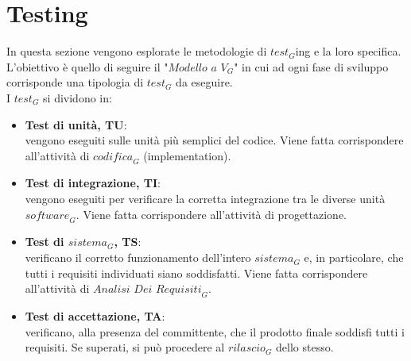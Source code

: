 \section{Testing}
In questa sezione vengono esplorate le metodologie di $\textit{test}_G$ing e la loro specifica. L'obiettivo è quello di seguire il "$\textit{Modello a V}_G$" in cui ad ogni fase di sviluppo corrisponde una tipologia di $\textit{test}_G$ da eseguire.\\
I $\textit{test}_G$ si dividono in:
\begin{itemize}
    \item \textbf{Test di unità, TU}:\\
    vengono eseguiti sulle unità più semplici del codice. Viene fatta corrispondere all'attività di $\textit{codifica}_G$ (implementation).
    \item \textbf{Test di integrazione, TI}:\\
    vengono eseguiti per verificare la corretta integrazione tra le diverse unità $\textit{software}_G$. Viene fatta corrispondere all'attività di progettazione.
    \item \textbf{Test di $\textit{sistema}_G$, TS}:\\
    verificano il corretto funzionamento dell'intero $\textit{sistema}_G$ e, in particolare, che tutti i requisiti individuati siano soddisfatti. Viene fatta corrispondere all'attività di $\textit{Analisi Dei Requisiti}_G$. 
    \item \textbf{Test di accettazione, TA}:\\
    verificano, alla presenza del committente, che il prodotto finale soddisfi tutti i requisiti. Se superati, si può procedere al $\textit{rilascio}_G$ dello stesso.
\end{itemize}
